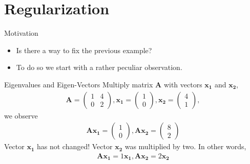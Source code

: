 \documentclass[notes=only]{beamer}
\begin{document}
  \section{Regularization}

  \begin{frame}{Motivation}
    \begin{itemize}
      \item Is there a way to fix the previous example?
      \item To do so we start with a rather peculiar observation.
    \end{itemize}
  \end{frame}

  \begin{frame}{Eigenvalues and Eigen-Vectors}
    Multiply matrix $\mathbf{A}$ with vectors $\mathbf{x_1}$ and $\mathbf{x_2}$,
    \begin{align}
      \mathbf{A} = \begin{pmatrix}
        1 & 4 \\
        0 & 2 
      \end{pmatrix},
      \mathbf{x_1} = \begin{pmatrix}
        1 \\ 0
      \end{pmatrix},
        \mathbf{x_2} = \begin{pmatrix}
          4 \\
          1
     \end{pmatrix},
    \end{align}
    we observe
    \begin{align}
      \mathbf{A}\mathbf{x_1} = \begin{pmatrix}
        1 \\ 0
      \end{pmatrix},
      \mathbf{A}\mathbf{x_2} = \begin{pmatrix}
        8 \\ 2
      \end{pmatrix}
    \end{align}
    Vector $\mathbf{x_1}$ has not changed! Vector $\mathbf{x_2}$ was multiplied by two.
    In other words,
    \begin{align}
      \mathbf{A}\mathbf{x_1} = 1 \mathbf{x_1}, \mathbf{A}\mathbf{x_2} = 2 \mathbf{x_2} 
    \end{align}
  \end{frame}
\end{document}
